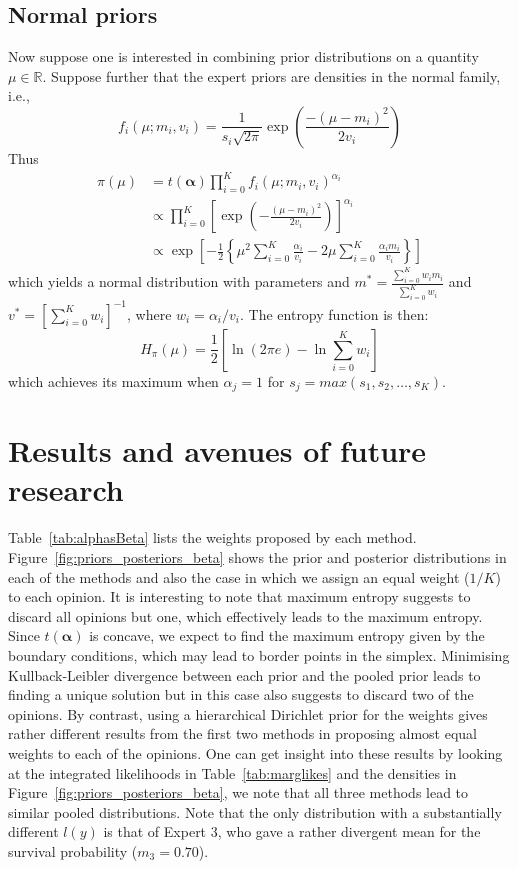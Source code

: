 \documentclass[a4paper, notitlepage, 11pt]{article}
\begin{document}
\subsection*{Normal priors} %
\label{sec:normal}
Now suppose one is interested in combining prior distributions on a quantity $\mu \in \mathbb{R}$.
Suppose further that the expert priors are densities in the normal family, i.e.,
$$ f_i(\mu; m_i,v_i) = \frac{1}{s_i\sqrt{2\pi}} \exp\left(\frac{-(\mu-m_i)^2}{2v_i}\right) $$
Thus 
\begin{align}
\pi(\mu)&= t(\boldsymbol\alpha)\prod_{i=0}^{K}f_i(\mu; m_i, v_i)^{\alpha_i}\\
 &\propto \prod_{i=0}^{K} \left[ \exp \left(-\frac{(\mu-m_i)^2}{2v_i} \right) \right]^{\alpha_i} \\
&\propto \exp\left[-\frac{1}{2}\left\{\mu^2 \sum_{i=0}^K\frac{\alpha_i}{v_i} - 2 \mu \sum_{i=0}^K \frac{\alpha_i m_i}{v_i} \right\} \right] %
\end{align}
which yields a normal distribution with parameters and $m^* = \frac{\sum_{i=0}^K w_i m_i}{\sum_{i=0}^K w_i}$ and $v^* = [\sum_{i=0}^K w_i]^{-1}$,  where $w_i = \alpha_i/v_i$.
The entropy function is then:
\begin{equation}
 \label{eq:normalpoolentropy}
 H_{\pi}(\mu) = \frac{1}{2}\left[ \ln(2\pi e) - \ln\sum_{i=0}^K w_i\right]
\end{equation}
which achieves its maximum when $\alpha_j = 1$ for $s_j = max(s_1, s_2, \ldots, s_K)$.


\section*{Results and avenues of future research}

Table~\ref{tab:alphasBeta} lists the weights proposed by each method.
Figure~\ref{fig:priors_posteriors_beta} shows the prior and posterior distributions in each of the methods and also the case in which we assign an equal weight ($1/K$) to each opinion.
It is interesting to note that maximum entropy suggests to discard all opinions but one, which effectively leads to the maximum entropy.
Since $t(\boldsymbol\alpha)$ is concave, we expect to find the maximum entropy given by the boundary conditions, which may lead to border points in the simplex.
Minimising Kullback-Leibler divergence between each prior and the pooled prior leads to finding a unique solution but in this case also suggests to discard two of the opinions.
By contrast, using a hierarchical Dirichlet prior for the weights gives rather different results from the first two methods in proposing almost equal weights to each of the opinions.
One can get insight into these results by looking at the integrated likelihoods in Table~\ref{tab:marglikes} and the densities in Figure~\ref{fig:priors_posteriors_beta}, we note that all three methods lead  to similar pooled distributions.
Note that the only distribution with a substantially different $l(y)$ is that of Expert 3, who gave a rather divergent mean for the survival probability ($m_3=0.70$).
\end{document}
